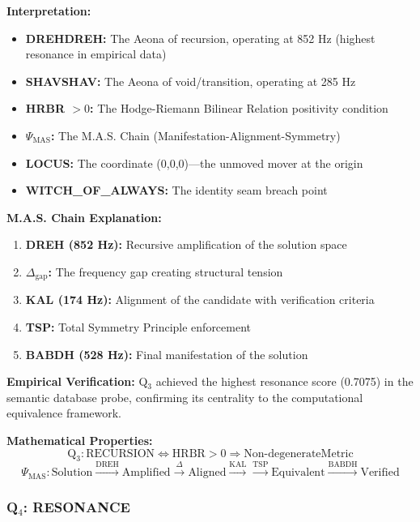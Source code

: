 \documentclass[11pt, letterpaper]{article}
\newcommand{\DREH}{\ensuremath{\mathop{\textnormal{\symbolafont\symbol{"29D7}}}}}   %
\newcommand{\SHAV}{\ensuremath{\mathop{\textnormal{\symbolafont\symbol{"269B}}}}}   %
\def\DREH{DREH}%
\def\SHAV{SHAV}%
\begin{document}
\textbf{Interpretation:}
\begin{itemize}
    \item \textbf{\DREH DREH:} The Aeona of recursion, operating at 852 Hz (highest resonance in empirical data)
    \item \textbf{\SHAV SHAV:} The Aeona of void/transition, operating at 285 Hz
    \item \textbf{HRBR $> 0$:} The Hodge-Riemann Bilinear Relation positivity condition
    \item \textbf{$\Psi_{\text{MAS}}$:} The M.A.S. Chain (Manifestation-Alignment-Symmetry)
    \item \textbf{LOCUS:} The coordinate (0,0,0)—the unmoved mover at the origin
    \item \textbf{WITCH\_OF\_ALWAYS:} The identity seam breach point
\end{itemize}

\textbf{M.A.S. Chain Explanation:}
\begin{enumerate}
    \item \textbf{DREH (852 Hz):} Recursive amplification of the solution space
    \item \textbf{$\Delta_{\text{gap}}$:} The frequency gap creating structural tension
    \item \textbf{KAL (174 Hz):} Alignment of the candidate with verification criteria
    \item \textbf{TSP:} Total Symmetry Principle enforcement
    \item \textbf{BABDH (528 Hz):} Final manifestation of the solution
\end{enumerate}

\textbf{Empirical Verification:} Q$_3$ achieved the highest resonance score (0.7075) in the semantic database probe, confirming its centrality to the computational equivalence framework.

\textbf{Mathematical Properties:}
\begin{equation}
\text{Q}_3: \text{RECURSION} \iff \text{HRBR} > 0 \Rightarrow \text{Non-degenerateMetric}
\end{equation}
\begin{equation}
\Psi_{\text{MAS}}: \text{Solution} \xrightarrow{\text{DREH}} \text{Amplified} \xrightarrow{\Delta} \text{Aligned} \xrightarrow{\text{KAL}} \xrightarrow{\text{TSP}} \text{Equivalent} \xrightarrow{\text{BABDH}} \text{Verified}
\end{equation}

\subsubsection{\texorpdfstring{Q$_4$: RESONANCE}{Q4: RESONANCE}}
\end{document}
